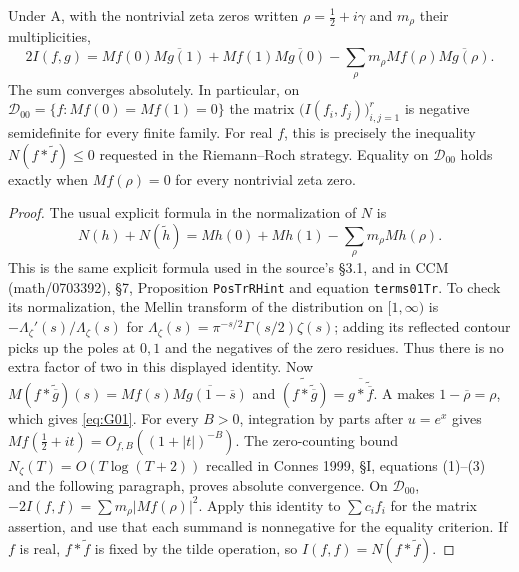 \begin{proposition}
\label{AC-G01}
Under A, with the nontrivial zeta zeros written
$\rho=\tfrac12+i\gamma$ and $m_\rho$ their multiplicities,
\begin{equation}\label{eq:G01}
 2I(f,g)=Mf(0)\overline{Mg(1)}+Mf(1)\overline{Mg(0)}
 -\sum_\rho m_\rho Mf(\rho)\overline{Mg(\rho)}.
\end{equation}
The sum converges absolutely.  In particular, on
$\mathcal D_{00}=\{f:Mf(0)=Mf(1)=0\}$ the matrix
$\bigl(I(f_i,f_j)\bigr)_{i,j=1}^r$ is negative semidefinite for every finite
family.  For real $f$, this is precisely the inequality
$N(f*\widetilde f)\leq0$ requested in the Riemann--Roch strategy.
Equality on $\mathcal D_{00}$ holds exactly when $Mf(\rho)=0$ for every
nontrivial zeta zero.
\end{proposition}
\begin{proof}
The usual explicit formula in the normalization of $N$ is
\[
 N(h)+N(\widetilde h)=Mh(0)+Mh(1)-\sum_\rho m_\rho Mh(\rho).
\]
This is the same explicit formula used in the source's \S3.1, and in
CCM (math/0703392), \S7, Proposition \texttt{PosTrRHint} and equation
\texttt{terms01Tr}.  To check its normalization, the Mellin transform
of the distribution on $[1,\infty)$ is
$-\Lambda_\zeta'(s)/\Lambda_\zeta(s)$ for
$\Lambda_\zeta(s)=\pi^{-s/2}\Gamma(s/2)\zeta(s)$; adding its reflected
contour picks up the poles at $0,1$ and the negatives of the zero residues.
Thus there is no extra factor of two in this displayed identity.
Now
$M(f*\widetilde{\overline g})(s)=Mf(s)\overline{Mg(1-\overline s)}$
and
$\widetilde{(f*\widetilde{\overline g})}
 =\overline{g*\widetilde{\overline f}}$.
A makes $1-\overline\rho=\rho$, which gives \eqref{eq:G01}.
For every $B>0$, integration by parts after $u=e^x$ gives
$Mf(\tfrac12+it)=O_{f,B}((1+|t|)^{-B})$.
The zero-counting bound $N_\zeta(T)=O(T\log(T+2))$ recalled in
Connes 1999, \S I, equations (1)--(3) and the following paragraph,
proves absolute convergence.  On $\mathcal D_{00}$,
$-2I(f,f)=\sum m_\rho|Mf(\rho)|^2$.  Apply this identity to
$\sum c_if_i$ for the matrix assertion, and use that each summand is
nonnegative for the equality criterion.  If $f$ is real,
$f*\widetilde f$ is fixed by the tilde operation, so
$I(f,f)=N(f*\widetilde f)$.
\end{proof}

